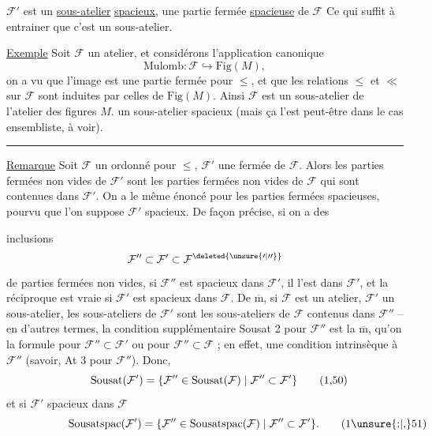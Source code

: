$\mathcal F'$ est un \uline{sous-atelier} \uline{spacieux},  une partie fermée \uline{spacieuse} de $\mathcal F$  Ce qui suffit à entrainer que c'est un sous-atelier.

\uline{Exemple} Soit $\mathcal F$ un atelier, et considérons l'application canonique 
\[
\mathrm{Mulomb}\colon\mathcal F\hookrightarrow\mathrm{Fig}(M),
\]
on a vu que l'image est une partie fermée pour $\leq$, et que les relations $\leq$ et $\ll$ sur $\mathcal F$ sont induites par celles de $\mathrm{Fig}(M)$. Ainsi $\mathcal F$ est un sous-atelier de l'atelier des figures  $M$.   un sous-atelier spacieux (mais ça l'est peut-être dans le cas ensembliste, à voir).

\par\noindent\hfill\rule{2cm}{.3pt}\hfill\mbox{}\par


\uline{Remarque} Soit $\mathcal F$ un ordonné pour $\leq$, $\mathcal F'$ une  fermée  de $\mathcal F$. Alors les parties fermées non vides de $\mathcal F'$ sont  les parties fermées non vides de $\mathcal F$ qui sont contenues dans $\mathcal F'$. On a le même énoncé pour les parties fermées spacieuses, pourvu que l'on suppose $\mathcal F'$ spacieux. De façon précise, si on a des

inclusions
\[
\mathcal F''\subset\mathcal F'\subset\mathcal F^{\deleted{\unsure{\prime|\prime\prime}}}
\]
de parties fermées non vides, si $\mathcal F''$ est spacieux dans $\mathcal F'$, il l'est dans $\mathcal F'$, et la réciproque est vraie si $\mathcal F'$ est spacieux dans $\mathcal F$. De $\overline{\mathrm m}$, si $\mathcal F$ est un atelier, $\mathcal F'$ un sous-atelier, les sous-ateliers de $\mathcal F'$ sont les sous-ateliers de $\mathcal F$ contenus dans $\mathcal F''$ -- en d'autres termes, la condition supplémentaire Sousat 2 pour $\mathcal F''$ est la $\overline{\mathrm m}$, qu'on la formule pour $\mathcal F''\subset\mathcal F'$ ou pour $\mathcal F''\subset\mathcal F$ ; en effet,  une condition intrinsèque à $\mathcal F''$ (savoir, At 3 pour $\mathcal F''$). Donc, 
\[
\mathrm{Sousat}(\mathcal F')=\{\mathcal F''\in\mathrm{Sousat}(\mathcal F)\mid\mathcal F''\subset\mathcal F'\}
\tag*{\makebox[0pt][r]{\makebox[\displaywidth][l]{(1,50)}}}
\]
et si $\mathcal F'$ spacieux dans $\mathcal F$
\[
\mathrm{Sousatspac}(\mathcal F')=\{\mathcal F''\in\mathrm{Sousatspac}(\mathcal F)\mid\mathcal F''\subset\mathcal F'\}.
\tag*{\makebox[0pt][r]{\makebox[\displaywidth][l]{(1\unsure{;|,}51)}}}
\]


